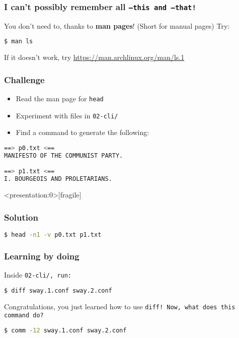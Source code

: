 \begin{frame}[fragile]
\frametitle{I can't possibly remember all \tt{--this} and \tt{--that}!}
You don't need to, thanks to \textbf{man pages}! (Short for manual pages)
\newline \newline
Try:
\begin{lstlisting}[language=bash]
$ man ls
\end{lstlisting}

If it doesn't work, try \url{https://man.archlinux.org/man/ls.1}
\end{frame}

\begin{frame}[fragile]
\frametitle{Challenge}
\begin{itemize}
    \item Read the man page for \tt{head}
    \item Experiment with files in \tt{02-cli/}
    \item Find a command to generate the following:
\end{itemize}
\begin{lstlisting}[language=bash]
==> p0.txt <==
MANIFESTO OF THE COMMUNIST PARTY.

==> p1.txt <==
I. BOURGEOIS AND PROLETARIANS.
\end{lstlisting}
\end{frame}

\begin{frame}<presentation:0>[fragile]
\frametitle{Solution}
\begin{lstlisting}[language=bash]
$ head -n1 -v p0.txt p1.txt
\end{lstlisting}
\end{frame}

\begin{frame}[fragile]
\frametitle{Learning by doing}
Inside \tt{02-cli/}, run:
\begin{lstlisting}[language=bash]
$ diff sway.1.conf sway.2.conf
\end{lstlisting}
Congratulations, you just learned how to use \tt{diff}!
\newline \newline
Now, what does this command do?
\begin{lstlisting}[language=bash]
$ comm -12 sway.1.conf sway.2.conf
\end{lstlisting}
\end{frame}

